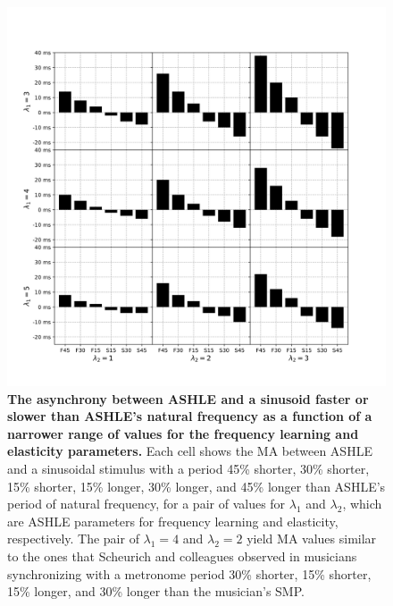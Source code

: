 \documentclass{report}
\begin{document}
\begin{figure}
    \centering
    \includegraphics[width=1.0\textwidth]{figures/fig3_7.png}
    \caption[The asynchrony between ASHLE and a sinusoid faster or slower than ASHLE's natural frequency as a function of a narrower range of values for the frequency learning and elasticity parameters]{\textbf{The asynchrony between ASHLE and a sinusoid faster or slower than ASHLE's natural frequency as a function of a narrower range of values for the frequency learning and elasticity parameters.} Each cell shows the MA between ASHLE and a sinusoidal stimulus with a period 45\% shorter, 30\% shorter, 15\% shorter, 15\% longer, 30\% longer, and 45\% longer than ASHLE's period of natural frequency, for a pair of values for $\lambda_1$ and $\lambda_2$, which are ASHLE parameters for frequency learning and elasticity, respectively. The pair of $\lambda_1=4$ and $\lambda_2=2$ yield MA values similar to the ones that Scheurich and colleagues \cite{scheurich2018tapping} observed in musicians synchronizing with a metronome period 30\% shorter, 15\% shorter, 15\% longer, and 30\% longer than the musician's SMP.}
    \label{f3_7}
\end{figure}
\end{document}
